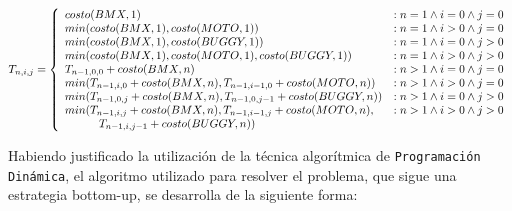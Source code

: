 \begin{displaymath}
   T_{n,i,j} = \left\{
     \begin{array}{lr}
       costo(BMX,1) & : n = 1 \land i = 0 \land j = 0 \\
       min(costo(BMX,1), costo(MOTO,1))  & : n = 1 \land i > 0 \land j = 0  \\
       min(costo(BMX,1), costo(BUGGY,1))  & : n = 1 \land i = 0 \land j > 0  \\
       min(costo(BMX,1), costo(MOTO,1), costo(BUGGY,1) )  & : n = 1 \land i > 0 \land j > 0  \\
       T_{n-1,0,0} + costo(BMX,n) & : n > 1 \land i = 0 \land j = 0  \\
       min(T_{n-1,i,0} + costo(BMX,n), T_{n-1,i-1,0} + costo(MOTO,n)) & : n > 1 \land i > 0 \land j = 0  \\
       min(T_{n-1,0,j} + costo(BMX,n), T_{n-1,0,j-1} + costo(BUGGY,n)) & : n > 1 \land i = 0 \land j > 0  \\
       min(T_{n-1,i,j} + costo(BMX,n), T_{n-1,i-1,j} + costo(MOTO,n), & : n > 1 \land i > 0 \land j > 0 \\
                    \indent \indent T_{n-1,i,j-1} + costo(BUGGY,n))
     \end{array}
   \right.
\end{displaymath}

Habiendo justificado la utilización de la técnica algorítmica de \texttt{Programación Dinámica}, el algoritmo utilizado para resolver el problema, que sigue una estrategia bottom-up, se desarrolla de la siguiente forma:

